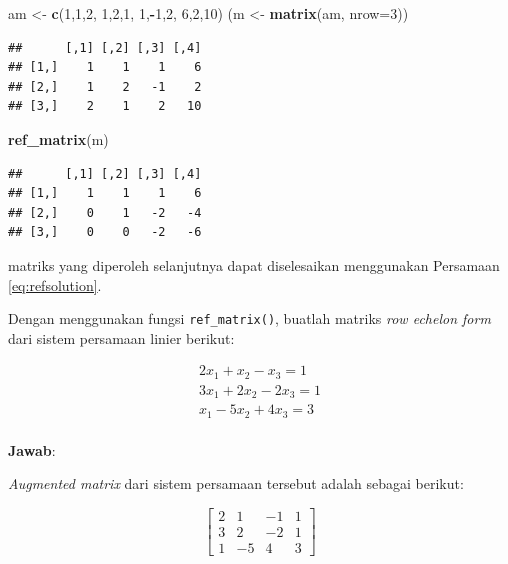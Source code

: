 \documentclass[]{book}
\newenvironment{Shaded}{\begin{snugshade}}{\end{snugshade}}
\newcommand{\DataTypeTok}[1]{\textcolor[rgb]{0.13,0.29,0.53}{#1}}
\newcommand{\DecValTok}[1]{\textcolor[rgb]{0.00,0.00,0.81}{#1}}
\newcommand{\KeywordTok}[1]{\textcolor[rgb]{0.13,0.29,0.53}{\textbf{#1}}}
\newcommand{\NormalTok}[1]{#1}
\newcommand{\OperatorTok}[1]{\textcolor[rgb]{0.81,0.36,0.00}{\textbf{#1}}}
\newcommand{\StringTok}[1]{\textcolor[rgb]{0.31,0.60,0.02}{#1}}
\theoremstyle{definition}
\theoremstyle{definition}
\theoremstyle{definition}
\theoremstyle{remark}
\let\BeginKnitrBlock\begin \let\EndKnitrBlock\end
\begin{document}
\begin{Shaded}
\begin{Highlighting}[]
\NormalTok{am <-}\StringTok{ }\KeywordTok{c}\NormalTok{(}\DecValTok{1}\NormalTok{,}\DecValTok{1}\NormalTok{,}\DecValTok{2}\NormalTok{,}
        \DecValTok{1}\NormalTok{,}\DecValTok{2}\NormalTok{,}\DecValTok{1}\NormalTok{,}
        \DecValTok{1}\NormalTok{,}\OperatorTok{-}\DecValTok{1}\NormalTok{,}\DecValTok{2}\NormalTok{,}
        \DecValTok{6}\NormalTok{,}\DecValTok{2}\NormalTok{,}\DecValTok{10}\NormalTok{)}
\NormalTok{(m <-}\StringTok{ }\KeywordTok{matrix}\NormalTok{(am, }\DataTypeTok{nrow=}\DecValTok{3}\NormalTok{))}
\end{Highlighting}
\end{Shaded}

\begin{verbatim}
##      [,1] [,2] [,3] [,4]
## [1,]    1    1    1    6
## [2,]    1    2   -1    2
## [3,]    2    1    2   10
\end{verbatim}

\begin{Shaded}
\begin{Highlighting}[]
\KeywordTok{ref_matrix}\NormalTok{(m)}
\end{Highlighting}
\end{Shaded}

\begin{verbatim}
##      [,1] [,2] [,3] [,4]
## [1,]    1    1    1    6
## [2,]    0    1   -2   -4
## [3,]    0    0   -2   -6
\end{verbatim}

matriks yang diperoleh selanjutnya dapat diselesaikan menggunakan Persamaan \eqref{eq:refsolution}.

\BeginKnitrBlock{example}
\protect\hypertarget{exm:refexm2}{}{\label{exm:refexm2} }Dengan menggunakan fungsi \texttt{ref\_matrix()}, buatlah matriks \emph{row echelon form} dari sistem persamaan linier berikut:
\EndKnitrBlock{example}

\[
\begin{matrix}
  2x_1+x_2-x_3=1 \\
  3x_1+2x_2-2x_3=1 \\
  x_1-5x_2+4x_3=3 \\
\end{matrix}
\]

\textbf{Jawab}:

\emph{Augmented matrix} dari sistem persamaan tersebut adalah sebagai berikut:

\[
\begin{bmatrix}
     2 & 1 & -1 & 1     \\[0.3em]
     3 & 2 & -2 & 1     \\[0.3em]
     1 & -5 & 4 & 3
\end{bmatrix}
\]
\end{document}
